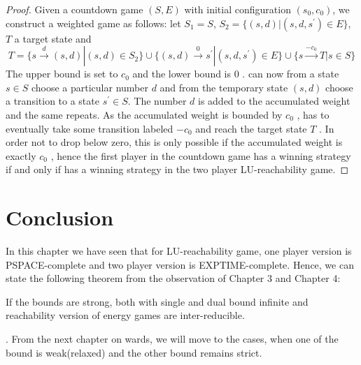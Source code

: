 \begin{proof}
Given a countdown game $(S, E)$ with initial configuration $(s_0 , c_0)$, we construct a weighted game as follows: let $S_1 = S$, $S_2 = \{(s, d) | (s, d, s^{\prime}) \in E\}$, $T$ a target state and  
$$
T= \{s\xrightarrow{d}(s,d)|(s,d)\in S_2\}\cup \{(s,d)\xrightarrow{0} s^{\prime}| (s,d,s^{\prime}) \in E\}\cup \{s \xrightarrow{-c_0}T|s \in S\}
$$
The upper bound is set to $c_0$ and the lower bound is $0$ .  can now from a state $s \in S$ choose a particular number $d$ and  from the temporary state $(s, d)$ choose a transition to a state $s^{\prime} \in S$. The number $d$ is added to the accumulated weight and the same repeats. As the accumulated weight is bounded by $c_0$ ,  has to eventually take some transition labeled $- c_0$ and reach the target state $T$ . In order not to drop below zero, this is only possible if the accumulated weight is exactly $c_0$ , hence the first player in the countdown game has a winning strategy if and only if  has a winning strategy in the two player LU-reachability game.
\end{proof}

\section{Conclusion}
In this chapter we have seen that for LU-reachability game, one player version is PSPACE-complete and two player version is EXPTIME-complete. Hence, we can state the following theorem from the observation of Chapter 3 and Chapter 4:
\begin{theorem}
If the bounds are strong, both with single and dual bound infinite and reachability version of energy games are inter-reducible.
\end{theorem}.
\vskip 0.3cm
From the next chapter on wards, we will move to the cases, when one of the bound is weak(relaxed) and the other bound remains strict.